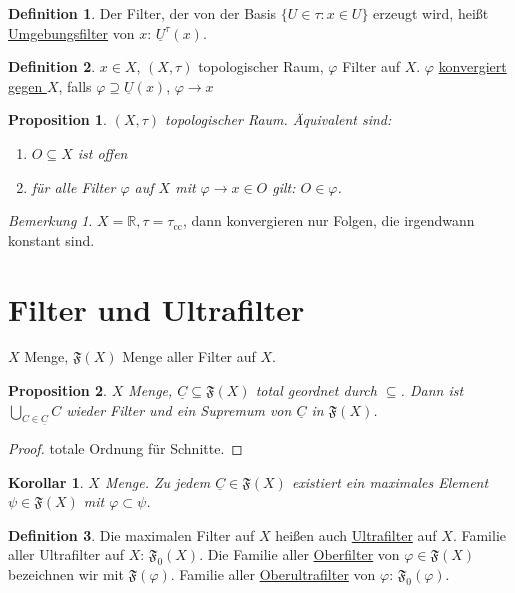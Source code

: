 \documentclass[12pt]{scrartcl}%
\newtheorem{prop}{Proposition}
\newtheorem{korollar}{Korollar}
\theoremstyle{definition}
\newtheorem*{defn}{Definition}
\theoremstyle{remark}
\newtheorem*{nb}{Bemerkung}
\newcommand{\filterset}{\mathfrak{F}}
\begin{document}
\begin{defn}
    Der Filter, der von der Basis $\{U\in\tau: x\in U\}$ erzeugt wird, heißt \underline{Umgebungsfilter} von $x$: $\underline{U}^\tau(x)$.
\end{defn}

\begin{defn}
    $x\in X$, $(X,\tau)$ topologischer Raum, $\varphi$ Filter auf $X$. $\varphi$ \underline{konvergiert gegen $X$}, falls $\varphi\supseteq \underline{U}(x)$, $\varphi \to x$
\end{defn}

\begin{prop}
    $(X,\tau)$ topologischer Raum. Äquivalent sind:

    \begin{enumerate}[label=(\arabic*)]
        \item $O\subseteq X$ ist offen
        \item für alle Filter $\varphi$ auf $X$ mit $\varphi\to x\in O$ gilt: $O\in\varphi$.
    \end{enumerate}
\end{prop}

\begin{nb}
    $X=\mathbb{R}, \tau=\tau_\text{cc}$, dann konvergieren nur Folgen, die irgendwann konstant sind.
\end{nb}

\section*{Filter und Ultrafilter}

$X$ Menge, $\filterset(X)$ Menge aller Filter auf $X$.

\begin{prop}
    $X$ Menge, $\underline{C}\subseteq \filterset(X)$ total geordnet durch $\subseteq$. Dann ist $\bigcup_{C\in\underline{C}} C$ wieder Filter und ein Supremum von $\underline{C}$ in $\filterset(X)$.
\end{prop}

\begin{proof}
    totale Ordnung für Schnitte.
\end{proof}

\begin{korollar}
    $X$ Menge. Zu jedem $\underline{C}\in\filterset(X)$ existiert ein maximales Element $\psi\in\filterset(X)$ mit $\varphi\subset \psi$.
\end{korollar}

\begin{defn}
    Die maximalen Filter auf $X$ heißen auch \underline{Ultrafilter} auf $X$. Familie aller Ultrafilter auf $X$: $\filterset_0(X)$. Die Familie aller \underline{Oberfilter} von $\varphi\in\filterset(X)$ bezeichnen wir mit $\filterset(\varphi)$. Familie aller \underline{Oberultrafilter} von $\varphi$: $\filterset_0(\varphi)$.
\end{defn}
\end{document}
